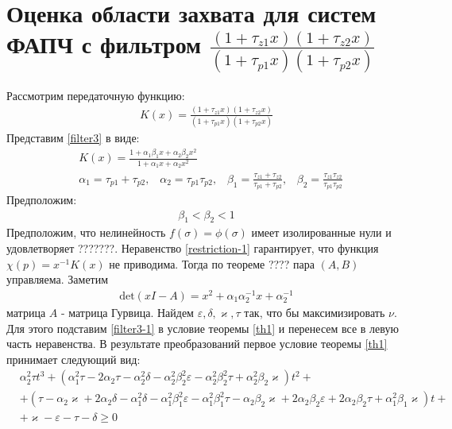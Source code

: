 \documentclass[a4paper,14pt]{extarticle} %
\begin{document}
\section{Оценка области захвата для систем ФАПЧ с фильтром $\frac{(1+\tau_{z1}x)(1+\tau_{z2}x)}{(1+\tau_{p1}x)(1+\tau_{p2}x)}$}
 Рассмотрим передаточную функцию:
 \begin{equation}\label{filter3}
 \begin{aligned}
K(x) = \frac{(1+\tau_{z1}x)(1+\tau_{z2}x)}{(1+\tau_{p1}x)(1+\tau_{p2}x)}
 \end{aligned}
\end{equation}
Представим \eqref{filter3} в виде:
 \begin{equation}\label{filter3-1}
 \begin{aligned}
&K(x) = \frac{1+\alpha_1\beta_1x + \alpha_2\beta_2x^2}{1+\alpha_1x + \alpha_2x^2}\\
&\alpha_1 = \tau_{p1} + \tau_{p2}\text{,}\quad 
\alpha_2 = \tau_{p1}\tau_{p2}\text{,}\quad 
\beta_1 = \frac{\tau_{z1}+\tau_{z2}}{\tau_{p1}+\tau_{p2}}\text{,}\quad 
\beta_2 = \frac{\tau_{z1}\tau_{z2}}{\tau_{p1}\tau_{p2}}
 \end{aligned}
\end{equation}
Предположим:
 \begin{equation}\label{restriction-1}
 \begin{aligned}
\beta_1 < \beta_2 < 1
 \end{aligned}
\end{equation}
Предположим, что нелинейность $f(\sigma)=\phi(\sigma)$ имеет изолированные нули и удовлетворяет ???????.
Неравенство \eqref{restriction-1} гарантирует, что функция $\chi(p) = x^{-1}K(x)$ не приводима. Тогда по теореме ???? пара $(A,B)$ управляема. Заметим
 \begin{equation}
 \begin{aligned}
\text{det}(xI-A) = x^2 + \alpha_1\alpha_2^{-1}x + \alpha_2^{-1}
 \end{aligned}
\end{equation}
матрица $A$ - матрица Гурвица. Найдем $\varepsilon, \delta, \varkappa, \tau$ так, что бы максимизировать $\nu$. Для этого подставим \eqref{filter3-1} в условие теоремы \ref{th1} и перенесем все в левую часть неравенства. В результате преобразований первое условие теоремы \ref{th1} принимает следующий вид:
 \begin{equation}
 \begin{aligned}
&\alpha_2^2\tau t^3 + (\alpha_1^2\tau - 2\alpha_2\tau - \alpha_2^2\delta - \alpha_2^2\beta_2^2\varepsilon - \alpha_2^2\beta_2^2\tau + \alpha_2^2\beta_2\varkappa)t^2 +\\
&+ (\tau - \alpha_2\varkappa + 2\alpha_2\delta - \alpha_1^2\delta - \alpha_1^2\beta_1^2\varepsilon - \alpha_1^2\beta_1^2\tau - \alpha_2\beta_2\varkappa + 2\alpha_2\beta_2\varepsilon + 2\alpha_2\beta_2\tau + \alpha_1^2\beta_1\varkappa)t + \\
&+ \varkappa - \varepsilon - \tau - \delta \geq 0
 \end{aligned}
\end{equation}
\end{document}
